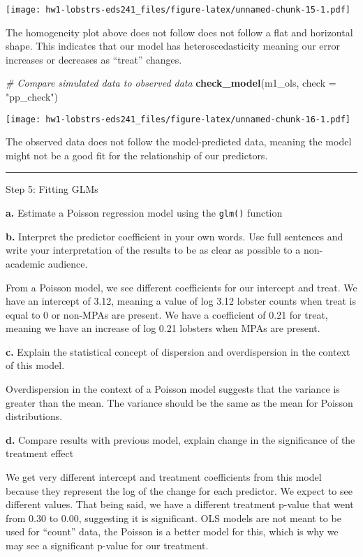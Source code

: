 \documentclass[
]{article}
\newenvironment{Shaded}{\begin{snugshade}}{\end{snugshade}}
\newcommand{\AttributeTok}[1]{\textcolor[rgb]{0.13,0.29,0.53}{#1}}
\newcommand{\CommentTok}[1]{\textcolor[rgb]{0.56,0.35,0.01}{\textit{#1}}}
\newcommand{\FunctionTok}[1]{\textcolor[rgb]{0.13,0.29,0.53}{\textbf{#1}}}
\newcommand{\NormalTok}[1]{#1}
\newcommand{\StringTok}[1]{\textcolor[rgb]{0.31,0.60,0.02}{#1}}
\begin{document}
\texttt{[image: hw1-lobstrs-eds241\_files/figure-latex/unnamed-chunk-15-1.pdf]}

The homogeneity plot above does not follow does not follow a flat and
horizontal shape. This indicates that our model has heteroscedasticity
meaning our error increases or decreases as ``treat'' changes.

\begin{Shaded}
\begin{Highlighting}[]
\CommentTok{\# Compare simulated data to observed data }
\FunctionTok{check\_model}\NormalTok{(m1\_ols, }\AttributeTok{check =} \StringTok{"pp\_check"}\NormalTok{)}
\end{Highlighting}
\end{Shaded}

\texttt{[image: hw1-lobstrs-eds241\_files/figure-latex/unnamed-chunk-16-1.pdf]}

The observed data does not follow the model-predicted data, meaning the
model might not be a good fit for the relationship of our predictors.

\begin{center}\rule{0.5\linewidth}{0.5pt}\end{center}

Step 5: Fitting GLMs

\textbf{a.} Estimate a Poisson regression model using the \texttt{glm()}
function

\textbf{b.} Interpret the predictor coefficient in your own words. Use
full sentences and write your interpretation of the results to be as
clear as possible to a non-academic audience.

From a Poisson model, we see different coefficients for our intercept
and treat. We have an intercept of 3.12, meaning a value of log 3.12
lobster counts when treat is equal to 0 or non-MPAs are present. We have
a coefficient of 0.21 for treat, meaning we have an increase of log 0.21
lobsters when MPAs are present.

\textbf{c.} Explain the statistical concept of dispersion and
overdispersion in the context of this model.

Overdispersion in the context of a Poisson model suggests that the
variance is greater than the mean. The variance should be the same as
the mean for Poisson distributions.

\textbf{d.} Compare results with previous model, explain change in the
significance of the treatment effect

We get very different intercept and treatment coefficients from this
model because they represent the log of the change for each predictor.
We expect to see different values. That being said, we have a different
treatment p-value that went from 0.30 to 0.00, suggesting it is
significant. OLS models are not meant to be used for ``count'' data, the
Poisson is a better model for this, which is why we may see a
significant p-value for our treatment.
\end{document}

